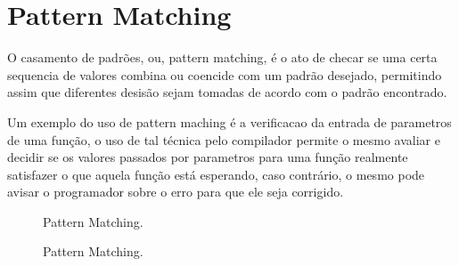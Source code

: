 \documentclass[rel_mlp]{iiufrgs}
\newcommand{\fonte}[1]{\\Fonte: {#1}}
\begin{document}
\section{Pattern Matching}

O casamento de padrões, ou, pattern matching, é o ato de checar se uma certa sequencia de valores combina ou coencide com um padrão desejado, permitindo assim que diferentes desisão sejam tomadas de acordo com o padrão encontrado.

	Um exemplo do uso de pattern maching é a verificacao da entrada de parametros de uma função, o uso de tal técnica pelo compilador permite o mesmo avaliar e decidir se os valores passados por parametros para uma função realmente satisfazer o que aquela função está esperando, caso contrário, o mesmo pode avisar o programador sobre o erro para que ele seja corrigido.

\begin{figure}[htb]
    \centering
    \label{fig:figura1}
    \caption{Pattern Matching.}
\end{figure}

\begin{figure}[htb]
    \centering
    \label{fig:figura1}
    \caption{Pattern Matching.}
\end{figure}
\end{document}
